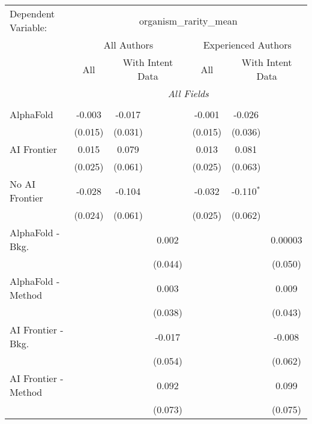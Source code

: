 \begingroup
\centering
\begin{tabular}{lcccccc}
   \tabularnewline \midrule \midrule
   Dependent Variable: & \multicolumn{6}{c}{organism\_rarity\_mean}\\
 & \multicolumn{3}{c}{All Authors} & \multicolumn{3}{c}{Experienced Authors} \\
\cmidrule(lr){2-4} \cmidrule(lr){5-7}
 & \multicolumn{1}{c}{All} & \multicolumn{2}{c}{With Intent Data} & \multicolumn{1}{c}{All} & \multicolumn{2}{c}{With Intent Data} \\
\cmidrule(lr){2-2} \cmidrule(lr){3-4} \cmidrule(lr){5-5} \cmidrule(lr){6-7}
 & \multicolumn{6}{c}{\textit{All Fields}} \\ \\
   AlphaFold               & -0.003  & -0.017  &         & -0.001  & -0.026       &   \\   
                           & (0.015) & (0.031) &         & (0.015) & (0.036)      &   \\   
   AI Frontier             & 0.015   & 0.079   &         & 0.013   & 0.081        &   \\   
                           & (0.025) & (0.061) &         & (0.025) & (0.063)      &   \\   
   No AI Frontier          & -0.028  & -0.104  &         & -0.032  & -0.110$^{*}$ &   \\   
                           & (0.024) & (0.061) &         & (0.025) & (0.062)      &   \\   
   AlphaFold - Bkg.        &         &         & 0.002   &         &              & 0.00003\\   
                           &         &         & (0.044) &         &              & (0.050)\\   
   AlphaFold - Method      &         &         & 0.003   &         &              & 0.009\\   
                           &         &         & (0.038) &         &              & (0.043)\\   
   AI Frontier - Bkg.      &         &         & -0.017  &         &              & -0.008\\   
                           &         &         & (0.054) &         &              & (0.062)\\   
   AI Frontier - Method    &         &         & 0.092   &         &              & 0.099\\   
                           &         &         & (0.073) &         &              & (0.075)\\   

\end{tabular}
